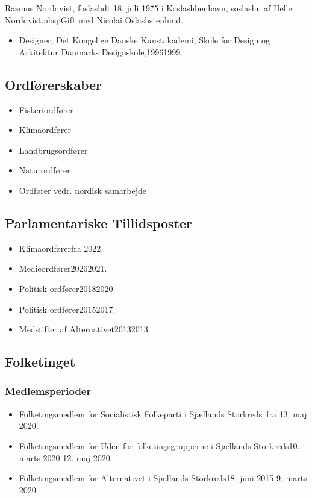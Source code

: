 \documentclass[11pt, a4paper]{awesome-cv}
\begin{document}
\makecvheader[R]
\makelettertitle
\begin{cvletter}
Rasmus Nordqvist, foslashdt 18. juli 1975 i Koslashbenhavn, soslashn af Helle Nordqvist.nbspGift med Nicolai Oslashstenlund.

\begin{itemize}
\item Designer, Det Kongelige Danske Kunstakademi, Skole for Design og Arkitektur Danmarks Designskole,19961999.
\end{itemize}
\subsection*{Ordførerskaber}
\begin{itemize}
\item Fiskeriordfører
\item Klimaordfører
\item Landbrugsordfører
\item Naturordfører
\item Ordfører vedr. nordisk samarbejde
\end{itemize}
\subsection*{Parlamentariske Tillidsposter}
\begin{itemize}
\item Klimaordførerfra 2022.
\item Medieordfører20202021.
\item Politisk ordfører20182020.
\item Politisk ordfører20152017.
\item Medstifter af Alternativet20132013.
\end{itemize}
\subsection*{Folketinget}
\subsubsection*{Medlemsperioder}
\begin{itemize}
\item Folketingsmedlem for Socialistisk Folkeparti i Sjællands Storkreds fra 13. maj 2020.
\item Folketingsmedlem for Uden for folketingsgrupperne i Sjællands Storkreds10. marts 2020  12. maj 2020.
\item Folketingsmedlem for Alternativet i Sjællands Storkreds18. juni 2015  9. marts 2020.
\end{itemize}

\end{cvletter}
\end{document}
